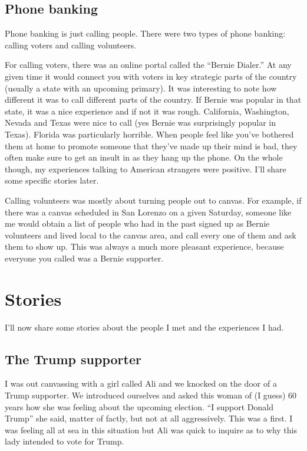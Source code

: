 \documentclass[]{book}
\begin{document}
\hypertarget{phone-banking}{%
\section{Phone banking}\label{phone-banking}}

Phone banking is just calling people. There were two types of phone banking: calling voters and calling volunteers.

For calling voters, there was an online portal called the ``Bernie Dialer.'' At any given time it would connect you with voters in key strategic parts of the country (usually a state with an upcoming primary). It was interesting to note how different it was to call different parts of the country. If Bernie was popular in that state, it was a nice experience and if not it was rough. California, Washington, Nevada and Texas were nice to call (yes Bernie was surprisingly popular in Texas). Florida was particularly horrible. When people feel like you've bothered them at home to promote someone that they've made up their mind is bad, they often make sure to get an insult in as they hang up the phone. On the whole though, my experiences talking to American strangers were positive. I'll share some specific stories later.

Calling volunteers was mostly about turning people out to canvas. For example, if there was a canvas scheduled in San Lorenzo on a given Saturday, someone like me would obtain a list of people who had in the past signed up as Bernie volunteers and lived local to the canvas area, and call every one of them and ask them to show up. This was always a much more pleasant experience, because everyone you called was a Bernie supporter.

\hypertarget{stories}{%
\chapter{Stories}\label{stories}}

I'll now share some stories about the people I met and the experiences I had.

\hypertarget{the-trump-supporter}{%
\section{The Trump supporter}\label{the-trump-supporter}}

I was out canvassing with a girl called Ali and we knocked on the door of a Trump supporter. We introduced ourselves and asked this woman of (I guess) 60 years how she was feeling about the upcoming election. ``I support Donald Trump'' she said, matter of factly, but not at all aggressively. This was a first. I was feeling all at sea in this situation but Ali was quick to inquire as to why this lady intended to vote for Trump.
\end{document}
